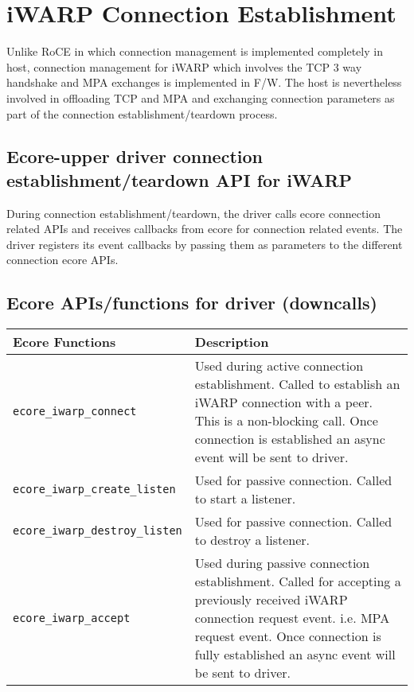 \documentclass[11pt,fleqn,hidelinks,oneside]{book} %
\begin{document}
\section{iWARP Connection Establishment}
Unlike RoCE in which connection management is implemented completely in host, connection management for iWARP which involves the TCP 3 way handshake and MPA exchanges is implemented in  F/W. The host is nevertheless involved in offloading TCP and MPA and exchanging connection parameters as part of the connection establishment/teardown process. 
\subsection{Ecore-upper driver connection establishment/teardown API for iWARP}
During connection establishment/teardown, the driver calls ecore connection related APIs and receives callbacks from ecore for connection related events. The driver registers its event callbacks by passing them as parameters to the different connection ecore APIs. 

\subsection{Ecore APIs/functions for driver (downcalls)}
\begin{tabular}{| l | p{10cm} |}
	\hline
	\textbf{Ecore Functions} & \textbf{Description} \\ \hline
	\texttt{ecore\_iwarp\_connect} & Used during active connection establishment. Called to establish an iWARP connection with a peer. This is a non-blocking call. Once connection is established an async event will be sent to driver. \\ \hline
	\texttt{ecore\_iwarp\_create\_listen} & Used for passive connection. Called to start a listener. \\ \hline
	\texttt{ecore\_iwarp\_destroy\_listen} & Used for passive connection. Called to destroy a listener. \\ \hline
	\texttt{ecore\_iwarp\_accept} & Used during passive connection establishment. Called for accepting a previously received iWARP connection request event. i.e. MPA request event. Once connection is fully established an async event will be sent to driver. \\ \hline

\end{tabular}
\end{document}
